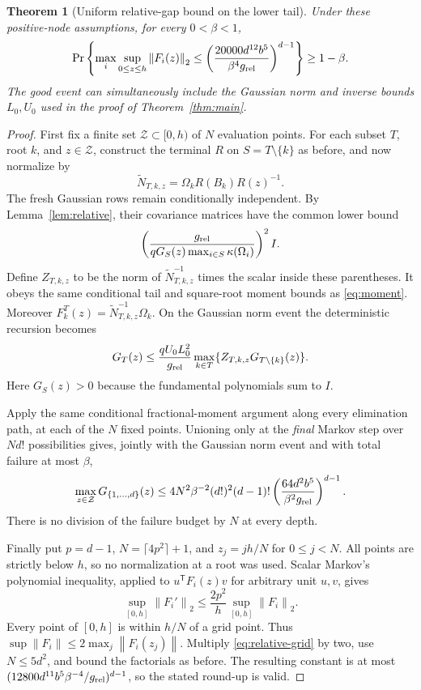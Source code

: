 \documentclass[11pt]{article}
\newtheorem{theorem}{Theorem}
\newcommand{\norm}[1]{\left\lVert#1\right\rVert}
\begin{document}
\begin{theorem}[Uniform relative-gap bound on the lower tail]
\label{thm:relative}
Under these positive-node assumptions, for every $0<\beta<1$,
\[
 \Pr\left\{\max_i\sup_{0\leq z\leq h}\norm{F_i(z)}_2
 \leq\left(\frac{20000d^{12}b^5}{\beta^4g_{\rm rel}}\right)^{d-1}
 \right\}\geq1-\beta.
\]
The good event can simultaneously include the Gaussian norm and inverse
bounds $L_0,U_0$ used in the proof of Theorem~\ref{thm:main}.
\end{theorem}
\begin{proof}
First fix a finite set $\mathcal Z\subset[0,h)$ of $N$ evaluation points.
For each subset $T$, root $k$, and $z\in\mathcal Z$, construct the
terminal $R$ on $S=T\setminus\{k\}$ as before, and now normalize by
\[
 \widetilde N_{T,k,z}=\Omega_k R(B_k)R(z)^{-1}.
\]
The fresh Gaussian rows remain conditionally independent. By
Lemma~\ref{lem:relative}, their covariance matrices have the common
lower bound
\[
 \left(\frac{g_{\rm rel}}{qG_S(z)\max_{i\in S}\kappa(\Omega_i)}\right)^2 I.
\]
Define $Z_{T,k,z}$ to be the norm of $\widetilde N_{T,k,z}^{-1}$
times the scalar inside these parentheses. It obeys the same conditional
tail and square-root moment bounds as \eqref{eq:moment}.
Moreover $F_k^T(z)=\widetilde N_{T,k,z}^{-1}\Omega_k$.
On the Gaussian norm event the deterministic recursion becomes
\[
 G_T(z)\leq\frac{qU_0L_0^2}{g_{\rm rel}}
             \max_{k\in T}\{Z_{T,k,z}G_{T\setminus\{k\}}(z)\}.
\]
Here $G_S(z)>0$ because the fundamental polynomials sum to $I$.

Apply the same conditional fractional-moment argument along every
elimination path, at each of the $N$ fixed points. Unioning only at the
\emph{final} Markov step over $Nd!$ possibilities gives, jointly with
the Gaussian norm event and with total failure at most $\beta$,
\begin{equation}\label{eq:relative-grid}
 \max_{z\in\mathcal Z}G_{\{1,\ldots,d\}}(z)
 \leq4N^2\beta^{-2}(d!)^2(d-1)!
       \left(\frac{64d^2b^5}{\beta^2g_{\rm rel}}\right)^{d-1}.
\end{equation}
There is no division of the failure budget by $N$ at every depth.

Finally put $p=d-1$, $N=\lceil4p^2\rceil+1$, and
$z_j=jh/N$ for $0\leq j<N$. All points are strictly below $h$, so no
normalization at a root was used. Scalar Markov's polynomial inequality,
applied to $u^{\mathsf T}F_i(z)v$ for arbitrary unit $u,v$, gives
\[
 \sup_{[0,h]}\norm{F_i'}_2
       \leq\frac{2p^2}{h}\sup_{[0,h]}\norm{F_i}_2.
\]
Every point of $[0,h]$ is within $h/N$ of a grid point. Thus
$\sup\norm{F_i}\leq2\max_j\norm{F_i(z_j)}$.
Multiply \eqref{eq:relative-grid} by two, use $N\leq5d^2$, and bound
the factorials as before. The resulting constant is at most
$(12800d^{11}b^5\beta^{-4}/g_{\rm rel})^{d-1}$, so the stated
round-up is valid.
\end{proof}
\end{document}

